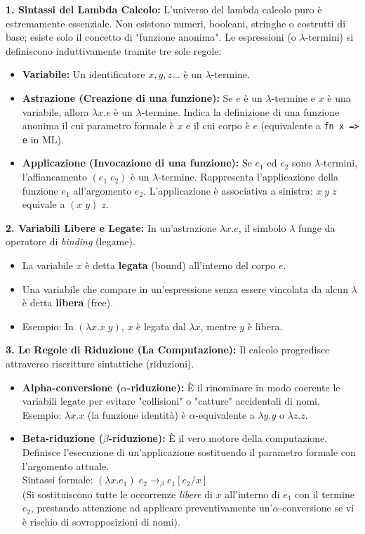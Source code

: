 \documentclass[12pt, a4paper]{article}
\begin{document}
\textbf{1. Sintassi del Lambda Calcolo:}
L'universo del lambda calcolo puro è estremamente essenziale. Non esistono numeri, booleani, stringhe o costrutti di base; esiste solo il concetto di "funzione anonima". 
Le espressioni (o $\lambda$-termini) si definiscono induttivamente tramite tre sole regole:
\begin{itemize}
    \item \textbf{Variabile:} Un identificatore $x, y, z \dots$ è un $\lambda$-termine.
    \item \textbf{Astrazione (Creazione di una funzione):} Se $e$ è un $\lambda$-termine e $x$ è una variabile, allora $\lambda x.e$ è un $\lambda$-termine. Indica la definizione di una funzione anonima il cui parametro formale è $x$ e il cui corpo è $e$ (equivalente a \texttt{fn x => e} in ML).
    \item \textbf{Applicazione (Invocazione di una funzione):} Se $e_1$ ed $e_2$ sono $\lambda$-termini, l'affiancamento $(e_1\; e_2)$ è un $\lambda$-termine. Rappresenta l'applicazione della funzione $e_1$ all'argomento $e_2$. L'applicazione è associativa a sinistra: $x\;y\;z$ equivale a $(x\;y)\;z$.
\end{itemize}

\textbf{2. Variabili Libere e Legate:}
In un'astrazione $\lambda x.e$, il simbolo $\lambda$ funge da operatore di \textit{binding} (legame). 
\begin{itemize}
    \item La variabile $x$ è detta \textbf{legata} (bound) all'interno del corpo $e$.
    \item Una variabile che compare in un'espressione senza essere vincolata da alcun $\lambda$ è detta \textbf{libera} (free).
    \item Esempio: In $(\lambda x.x\; y)$, $x$ è legata dal $\lambda x$, mentre $y$ è libera.
\end{itemize}

\textbf{3. Le Regole di Riduzione (La Computazione):}
Il calcolo progredisce attraverso riscritture sintattiche (riduzioni).
\begin{itemize}
    \item \textbf{Alpha-conversione ($\alpha$-riduzione):} È il rinominare in modo coerente le variabili legate per evitare "collisioni" o "catture" accidentali di nomi. 
    Esempio: $\lambda x.x$ (la funzione identità) è $\alpha$-equivalente a $\lambda y.y$ o $\lambda z.z$.
    \item \textbf{Beta-riduzione ($\beta$-riduzione):} È il vero motore della computazione. Definisce l'esecuzione di un'applicazione sostituendo il parametro formale con l'argomento attuale. \\
    Sintassi formale: $(\lambda x.e_1)\; e_2 \rightarrow_{\beta} e_1[e_2/x]$ \\
    (Si sostituiscono tutte le occorrenze \textit{libere} di $x$ all'interno di $e_1$ con il termine $e_2$, prestando attenzione ad applicare preventivamente un'$\alpha$-conversione se vi è rischio di sovrapposizioni di nomi).
\end{itemize}
\end{document}
